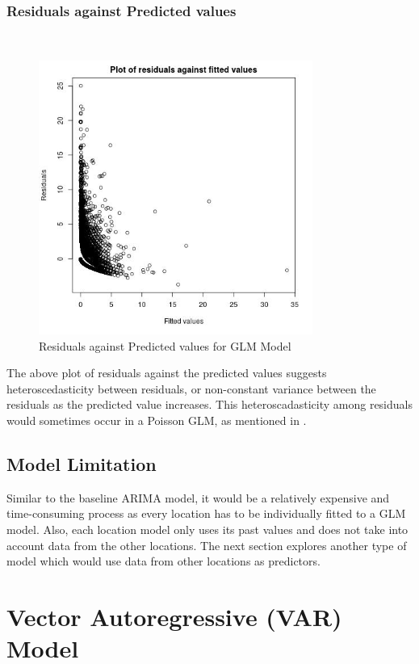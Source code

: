 \documentclass[nonblindrev,msom]{informs3} %
\begin{document}
\subsubsection{Residuals against Predicted values}
\hfill\\
\begin{figure}[H]
    \centering
    \includegraphics[width=0.8\textwidth, height=0.5\textheight]{Images/Full_GLM_resids_vs_fitted.jpg}
    \caption{Residuals against Predicted values for GLM Model}
    \label{fig:Residuals against Predicted values for GLM Model}
\end{figure}
The above plot of residuals against the predicted values suggests heteroscedasticity between residuals, or non-constant variance between the residuals as the predicted value increases. This heteroscadasticity among residuals would sometimes occur in a Poisson GLM, as mentioned in \cite{Dylan2017}. 

\subsection{Model Limitation}
Similar to the baseline ARIMA model, it would be a relatively expensive and time-consuming process as every location has to be individually fitted to a GLM model. Also, each location model only uses its past values and does not take into account data from the other locations. The next section explores another type of model which would use data from other locations as predictors. 

\section{Vector Autoregressive (VAR) Model}
\end{document}
